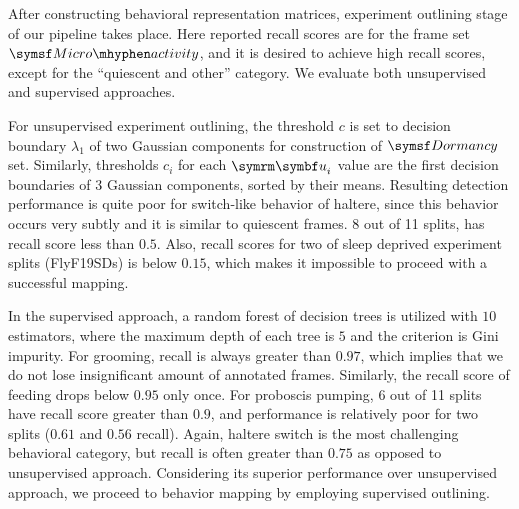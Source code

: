 After constructing behavioral representation matrices, experiment outlining stage of our pipeline takes place.
Here reported recall scores are for the frame set $\MicroActivity$, and it is desired to achieve high recall scores, except for the ``quiescent and other'' category.
We evaluate both unsupervised and supervised approaches.

For unsupervised experiment outlining, the threshold $c$ is set to decision boundary $\lambda_1$ of two Gaussian components for construction of $\Dormancy$ set.
Similarly, thresholds $c_i$ for each $\V{u}_i$ value are the first decision boundaries of $3$ Gaussian components, sorted by their means.
Resulting detection performance is quite poor for switch-like behavior of haltere, since this behavior occurs very subtly and it is similar to quiescent frames.
8 out of 11 splits, has recall score less than $0.5$.
Also, recall scores for two of sleep deprived experiment splits (FlyF19SDs) is below $0.15$, which makes it impossible to proceed with a successful mapping.

In the supervised approach, a random forest of decision trees \citep{breiman_random_2001} is utilized with $10$ estimators, where the maximum depth of each tree is $5$ and the criterion is Gini impurity.
For grooming, recall is always greater than $0.97$, which implies that we do not lose insignificant amount of annotated frames.
Similarly, the recall score of feeding drops below $0.95$ only once.
For proboscis pumping, 6 out of 11 splits have recall score greater than $0.9$, and performance is relatively poor for two splits ($0.61$ and $0.56$ recall).
Again, haltere switch is the most challenging behavioral category, but recall is often greater than $0.75$ as opposed to unsupervised approach.
Considering its superior performance over unsupervised approach, we proceed to behavior mapping by employing supervised outlining.


